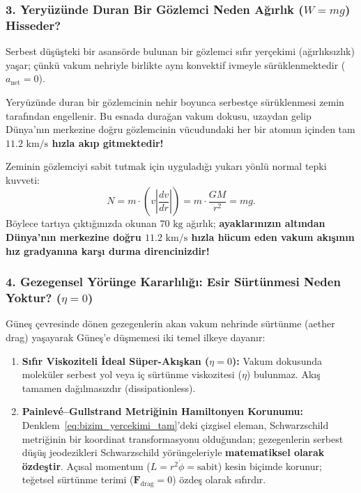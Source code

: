 \subsubsection{3. Yeryüzünde Duran Bir Gözlemci Neden Ağırlık ($W = mg$) Hisseder?}
Serbest düşüşteki bir asansörde bulunan bir gözlemci sıfır yerçekimi (ağırlıksızlık) yaşar; çünkü vakum nehriyle birlikte aynı konvektif ivmeyle sürüklenmektedir ($a_{\mathrm{net}} = 0$).

Yeryüzünde duran bir gözlemcinin nehir boyunca serbestçe sürüklenmesi zemin tarafından engellenir. Bu esnada durağan vakum dokusu, uzaydan gelip Dünya'nın merkezine doğru gözlemcinin vücudundaki her bir atomun içinden tam \textbf{$11.2\text{ km/s}$ hızla akıp gitmektedir!}

Zeminin gözlemciyi sabit tutmak için uyguladığı yukarı yönlü normal tepki kuvveti:
\begin{equation}
    N = m \cdot \left( v \left|\frac{dv}{dr}\right| \right) = m \cdot \frac{GM}{r^2} = mg.
\end{equation}
Böylece tartıya çıktığınızda okunan $70\text{ kg}$ ağırlık; \textbf{ayaklarınızın altından Dünya'nın merkezine doğru $11.2\text{ km/s}$ hızla hücum eden vakum akışının hız gradyanına karşı durma direncinizdir!}

\subsubsection{4. Gezegensel Yörünge Kararlılığı: Esir Sürtünmesi Neden Yoktur? ($\eta = 0$)}
Güneş çevresinde dönen gezegenlerin akan vakum nehrinde sürtünme (aether drag) yaşayarak Güneş'e düşmemesi iki temel ilkeye dayanır:
\begin{enumerate}
    \item \textbf{Sıfır Viskoziteli İdeal Süper-Akışkan ($\eta = 0$):} Vakum dokusunda moleküler serbest yol veya iç sürtünme viskozitesi ($\eta$) bulunmaz. Akış tamamen dağılmasızdır (dissipationless).
    \item \textbf{Painlev\'e--Gullstrand Metriğinin Hamiltonyen Korunumu:} Denklem~\eqref{eq:bizim_yercekimi_tam}'deki çizgisel eleman, Schwarzschild metriğinin bir koordinat transformasyonu olduğundan; gezegenlerin serbest düşüş jeodezikleri Schwarzschild yörüngeleriyle \textbf{matematiksel olarak özdeştir}. Açısal momentum ($L = r^2 \dot{\phi} = \text{sabit}$) kesin biçimde korunur; teğetsel sürtünme terimi ($\mathbf{F}_{\mathrm{drag}} = 0$) özdeş olarak sıfırdır.
\end{enumerate}

